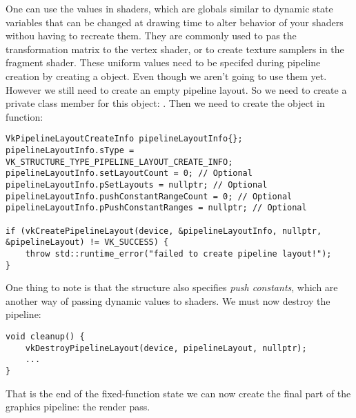 \par One can use the  values in shaders, which are globals similar to dynamic state variables that can be changed at drawing time to alter behavior of your shaders withou having to recreate them. They are commonly used to pas the transformation matrix to the vertex shader, or to create texture samplers in the fragment shader. These uniform values need to be specifed during pipeline creation by creating a  object. Even though we aren't going to use them yet. However we still need to create an empty pipeline layout. So we need to create a private class member for this object: . Then we need to create the object in  function:

\begin{center}
\begin{minipage}{0.95\linewidth}
\begin{lstlisting}
VkPipelineLayoutCreateInfo pipelineLayoutInfo{};
pipelineLayoutInfo.sType = VK_STRUCTURE_TYPE_PIPELINE_LAYOUT_CREATE_INFO;
pipelineLayoutInfo.setLayoutCount = 0; // Optional
pipelineLayoutInfo.pSetLayouts = nullptr; // Optional
pipelineLayoutInfo.pushConstantRangeCount = 0; // Optional
pipelineLayoutInfo.pPushConstantRanges = nullptr; // Optional

if (vkCreatePipelineLayout(device, &pipelineLayoutInfo, nullptr, &pipelineLayout) != VK_SUCCESS) {
    throw std::runtime_error("failed to create pipeline layout!");
}
\end{lstlisting}
\end{minipage}
\end{center}

\par One thing to note is that the structure also specifies \emph{push constants}, which are another way of passing dynamic values to shaders. We must now destroy the pipeline:

\begin{center}
\begin{minipage}{0.95\linewidth}
\begin{lstlisting}
void cleanup() {
    vkDestroyPipelineLayout(device, pipelineLayout, nullptr);
    ...
}
\end{lstlisting}
\end{minipage}
\end{center}

\par That is the end of the fixed-function state we can now create the final part of the graphics pipeline: the render pass.

